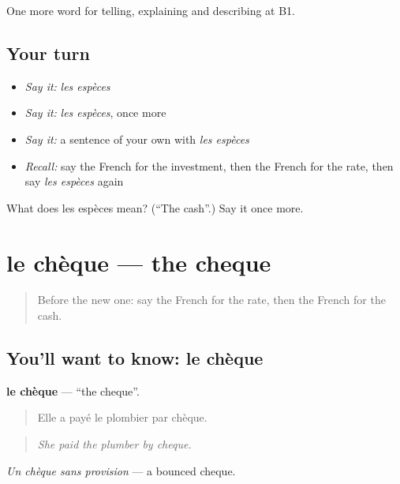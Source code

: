 \begin{grammarlens}[title={What you've built}]
One more word for telling, explaining and describing at B1.
\end{grammarlens}

\subsection*{Your turn}
\begin{itemize}
\raggedright
  \item \emph{Say it:} \emph{les espèces}
  \item \emph{Say it:} \emph{les espèces}, once more
  \item \emph{Say it:} a sentence of your own with \emph{les espèces}
  \item \emph{Recall:} say the French for the investment, then the French for the rate, then say \emph{les espèces} again
\end{itemize}

\begin{tcolorbox}[breakable,colback=teal!4,colframe=teal!35!black,title={Before you move on}]
What does les espèces mean? (\textquotedblleft{}The cash\textquotedblright{}.) Say it once more.
\end{tcolorbox}
\section[le chèque]{le chèque — the cheque}

\label{lesson:FR-C392-cheque}



\begin{quote}
Before the new one: say the French for the rate, then the French for the cash.
\end{quote}

\subsection*{You'll want to know: le chèque}
\textbf{le chèque} — \textquotedblleft{}the cheque\textquotedblright{}.

\begin{quote}
Elle a payé le plombier par chèque.
\end{quote}

\begin{quote}
\emph{She paid the plumber by cheque.}
\end{quote}

\emph{Un chèque sans provision} — a bounced cheque.

